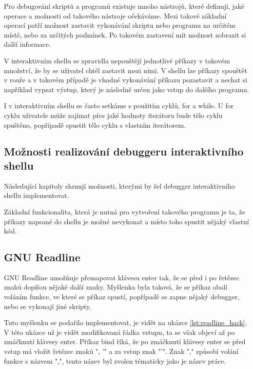 \documentclass[thesis=M,czech]{FITthesis}[2012/06/26]
\begin{document}

Pro debugování skriptů a programů existuje mnoho nástrojů, které definují, jaké operace a možnosti od takového nástroje očekáváme. Mezi takové základní operací patří možnost zastavit vykonávání skriptu nebo programu na určitém místě, nebo za určitých podmínek. Po takovém zastavení mít možnost zobrazit si další informace.

V interaktivním shellu se zpravidla nepouštějí jednotlivé příkazy v takovém množství, že by se uživatel chtěl zastavit mezi nimi. V shellu lze příkazy spouštět v rouře a v takovém případě je vhodné vykonávání příkazu pozastavit a nechat si například vypsat výstup, který je následně určen jako vstup do dalšího programu.

I v interaktivním shellu se často setkáme s použitím cyklů, for a while. U for cyklu uživatele může zajímat přes jaké hodnoty iterátoru bude tělo cyklu spuštěno, popřípadě spustit tělo cyklu s vlastním iterátorem.




\subsection{Možnosti realizování debuggeru interaktivního shellu}

Následující kapitoly shrnují možnosti, kterými by šel debugger interaktivního shellu implementovat.

Základní funkcionalita, která je nutná pro vytvoření takového programu je ta, že příkazy napsané do shellu je možné nevykonat a místo toho spustit nějaký vlastní kód.

\subsection{GNU Readline}

GNU Readline umožňuje přemapovat klávesu enter tak, že se před i po řetězec znaků dopíšou nějaké další znaky. Myšlenka byla taková, že se příkaz obalí voláním funkce, ve které se příkaz spustí, popřípadě se zapne nějaký debugger, nebo se vykonají jiné skripty.

Tuto myšlenku se podařilo implementovat, je vidět na ukázce \ref{lst:readline_hack}. V této ukázce už je vidět modifikovaná řádka vstupu, ta se však objeví až po zmáčknutí klávesy enter. Příkaz bind říká, že po zmáčknutí klávesy enter se před vstup má vložit řetězec znaků ", '" a za vstup znak "'". Znak "," způsobí volání funkce s názvem ",", tento název byl zvolen tématicky jako je název práce.
\end{document}
